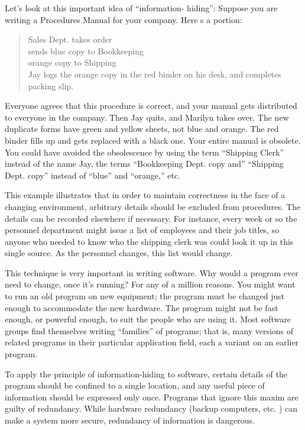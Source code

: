 Let's look at this important idea of ``information- hiding'': Suppose
you are writing a Procedures Manual for your company. Here s a portion:

\begin{quote}
Sales Dept. takes order\\
sends blue copy to Bookkeeping\\
orange copy to Shipping\\
Jay logs the orange copy in the red binder on his desk, and completes
packing slip.
\end{quote}
Everyone agrees that this procedure is correct, and your manual gets
distributed to everyone in the company. Then Jay quits, and Marilyn
takes over. The new duplicate forms have green and yellow sheets,
not blue and orange. The red binder fills up and gets replaced with
a black one. Your entire manual is obsolete. You could have avoided
the obsolescence by using the term {}``Shipping Clerk'' instead
of the name Jay, the terms {}``Bookkeeping Dept. copy and'' {}``Shipping Dept.
copy'' instead of {}``blue'' and {}``orange,'' etc.

This example illustrates that in order to maintain correctness in
the face of a changing environment, arbitrary details should be excluded
from procedures. The details can be recorded elsewhere if necessary.
For instance, every week or so the personnel department might issue
a list of employees and their job titles, so anyone who needed to
know who the shipping clerk was could look it up in this single source.
As the personnel changes, this list would change.

This technique is very important in writing software. Why would a
program ever need to change, once it's running? For any of a million
reasons. You might want to run an old program on new equipment; the
program must be changed just enough to accommodate the new hardware.
The program might not be fast enough, or powerful enough, to suit
the people who are using it. Most software groups find themselves
writing {}``families'' of programs; that is, many versions of related
programs in their particular application field, each a variant on
an earlier program. 

To apply the principle of information-hiding to software, certain
details of the program should be confined to a single location, and
any useful piece of information should be expressed only once. Programs
that ignore this maxim are guilty of redundancy. While hardware redundancy
(backup computers, etc. ) can make a system more secure, redundancy
of information is dangerous.

